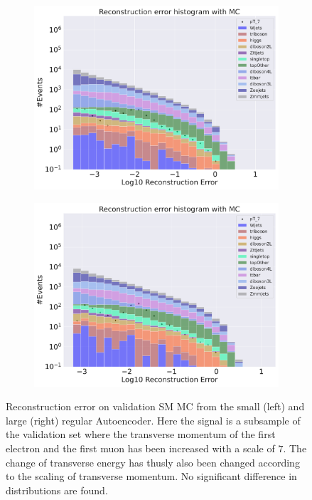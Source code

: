 \begin{figure}[h!]
    \centering
    \begin{subfigure}{.45\textwidth}
        \includegraphics[width=\textwidth]{Figures/AE_testing/small/b_data_recon_big_rm3_feats_sig_pT_7.pdf}
        \caption{ }
        \label{fig:ae_small_pt_7}
    \end{subfigure}
    \hfill 
    \begin{subfigure}{.45\textwidth}
        \includegraphics[width=\textwidth]{Figures/AE_testing/big/b_data_recon_big_rm3_feats_sig_pT_7.pdf}
        \caption{ }
        \label{fig:ae_big_pt_7}
    \end{subfigure}
    \hfill 
    \caption[AE | Reconstruction error $p_T$ altering of 7]{Reconstruction error on validation SM MC from the small (left) and large (right) regular Autoencoder. Here the signal is a subsample of the validation 
    set where the transverse momentum of the first electron and the first muon has been increased with a scale of $7$. The change of transverse 
    energy has thusly also been changed according to the scaling of transverse momentum. No significant difference in distributions are found. }
    \label{fig:ae_big_small_pt_7}
\end{figure}

